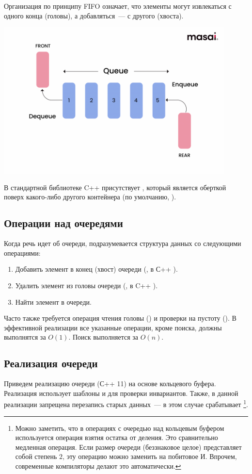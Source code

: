 Организация по принципу FIFO означает, что элементы могут извлекаться с одного конца (головы), а добавляться~--- с другого (хвоста).

\includegraphics[width=0.9\textwidth]{resources/19-26/queue.png}

В стандартной библиотеке C++ присутствует  , который является оберткой поверх
какого-либо другого контейнера (по умолчанию, ).

\subsection{Операции над очередями}
Когда речь идет об очереди, подразумевается структура данных со следующими операциями:
\begin{enumerate}
  \item Добавить элемент в конец (хвост) очереди (, в С++ ).
  \item Удалить элемент из головы очереди (, в C++ ).
  \item Найти элемент в очереди.
\end{enumerate}
%
Часто также требуется операция чтения головы () и проверки на пустоту (). В эффективной реализации
все указанные операции, кроме поиска, должны выполнятся за \(O(1)\). Поиск выполняется за $O(n)$.

\subsection{Реализация очереди}
Приведем реализацию очереди (С++ 11) на основе кольцевого буфера. Реализация использует шаблоны и 
для проверки инвариантов. Также, в данной реализации запрещена перезапись старых данных~--- в этом случае срабатывает  \footnote{Можно заметить, что в операциях с очередью над кольцевым буфером используется операция взятия остатка от деления. Это сравнительно
  медленная операция. Если размер очереди (беззнаковое целое) представляет собой степень \(2\), эту операцию можно заменить на побитовое И. Впрочем, современные
  компиляторы делают это автоматически.}.

